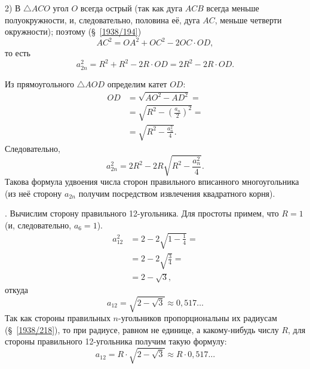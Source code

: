 {2) В $\triangle ACO$ угол $O$ всегда острый (так как дуга $ACB$ всегда меньше полуокружности, и, следовательно, половина её, дуга $AC$, меньше четверти окружности);
поэтому (§~\ref{1938/194})
\[AC^2=OA^2+OC^2-2OC\cdot OD,\]
то есть
\[a_{2n}^2=R^2+R^2-2R\cdot OD=2R^2-2R\cdot OD.\]

Из прямоугольного $\triangle AOD$ определим катет $OD$:
\begin{align*}
OD&=\sqrt{AO^2-AD^2}=
\\
&=\sqrt{R^2-(\tfrac{a_n}2)^2}=
\\
&=\sqrt{R^2-\tfrac{a_n^2}4}.
\end{align*}
Следовательно,
\[a_{2n}^2=2R^2-2R\sqrt{R^2-\frac{a_n^2}4}.\]
Такова формула удвоения числа сторон правильного вписанного многоугольника (из неё сторону $a_{2n}$ получим посредством извлечения квадратного корня).

}

\smallskip
{}.
Вычислим сторону правильного 12-угольника.
Для простоты примем, что $R=1$ (и, следовательно, $a_6 = 1$).
\begin{align*}
a_{12}^2&=2-2\sqrt{1-\tfrac14}=
\\
&=2-2\sqrt{\tfrac34}=
\\
&=2-\sqrt{3},
\end{align*}
откуда
\[a_{12}=\sqrt{2-\sqrt3}\approx 0{,}517\dots\]
Так как стороны правильных $n$-угольников пропорциональны их радиусам (§~\ref{1938/218}), то при радиусе, равном не единице, а какому-нибудь числу $R$, для стороны правильного 12-угольника получим такую формулу:
\[a_{12}=R\cdot \sqrt{2-\sqrt3}\approx R\cdot 0{,}517\dots\]

